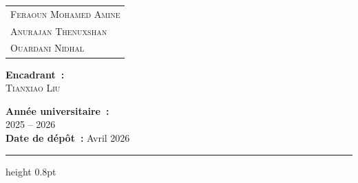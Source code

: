 \begin{titlepage}
  \vspace{2cm}

  \begin{minipage}{0.6\textwidth}
    \centering
    \large
    \begin{tabular}{l}
      \scshape{Feraoun} Mohamed Amine\\[0.4em]
      \scshape{Anurajan} Thenuxshan\\[0.4em]
      \scshape{Ouardani} Nidhal
    \end{tabular}
  \end{minipage}

  \vfill

  \begin{minipage}{0.48\textwidth}
    \raggedright
    \textbf{Encadrant~:}\\[0.3em]
    \textsc{Tianxiao Liu}\\
    
  \end{minipage}
  \hfill
  \begin{minipage}{0.48\textwidth}
    \raggedleft
    \textbf{Année universitaire~:}\\[0.3em]
    2025 -- 2026\\[0.5em]
    \textbf{Date de dépôt~:} Avril 2026
  \end{minipage}

  \vspace{0.2cm}
  \hrule height 0.8pt

\end{titlepage}